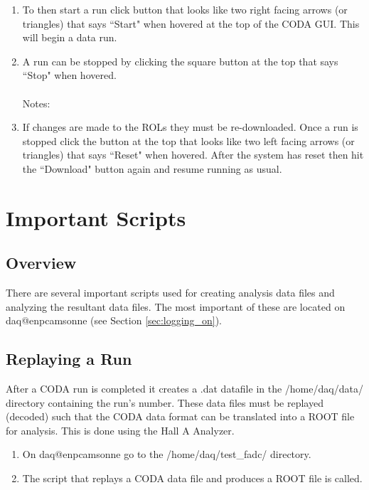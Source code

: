 \documentclass[oneside]{book}   %
\begin{document}
\begin{enumerate}
	\item To then start a run click button that looks like two right facing arrows (or triangles) that says ``Start" when hovered at the top of the CODA GUI. This will begin a data run.
	\item A run can be stopped by clicking the square button at the top that says ``Stop" when hovered.\\
	\\
	Notes:
	\item If changes are made to the ROLs they must be re-downloaded. Once a run is stopped click the button at the top that looks like two left facing arrows (or triangles) that says ``Reset" when hovered. After the system has reset then hit the ``Download" button again and resume running as usual.
\end{enumerate}

\chapter{Important Scripts}
\label{ch:scripts}

\section{Overview}
\label{sec:scripts_overview}

There are several important scripts used for creating analysis data files and analyzing the resultant data files. The most important of these are located on daq@enpcamsonne (see Section \cref{sec:logging_on}).

\section{Replaying a Run}
\label{sec:replay}

After a CODA run is completed it creates a .dat datafile in the /home/daq/data/ directory containing the run's number. These data files must be replayed (decoded) such that the CODA data format can be translated into a ROOT file for analysis. This is done using the Hall A Analyzer.

\begin{enumerate}
	\item On daq@enpcamsonne go to the /home/daq/test\_fadc/ directory. 
	\item The script that replays a CODA data file and produces a ROOT file is called. 
\end{enumerate}
\end{document}
